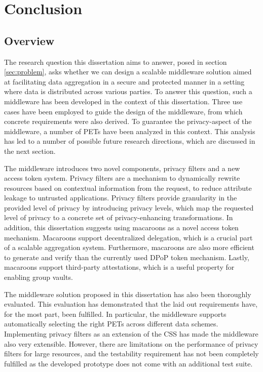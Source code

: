 \chapter{Conclusion}
\label{cha:conclusion}
\section{Overview}
The research question this dissertation aims to answer, posed in section \ref{sec:problem}, asks whether we can design a scalable middleware solution aimed at facilitating data aggregation in a secure and protected manner in a setting where data is distributed across various parties. To answer this question, such a middleware has been developed in the context of this dissertation. Three use cases have been employed to guide the design of the middleware, from which concrete requirements were also derived.  To guarantee the privacy-aspect of the middleware, a number of \acrlong{PETs} have been analyzed in this context. This analysis has led to a number of possible future research directions, which are discussed in the next section.

The middleware introduces two novel components, privacy filters and a new access token system. Privacy filters are a mechanism to dynamically rewrite resources based on contextual information from the request, to reduce attribute leakage to untrusted applications. Privacy filters provide granularity in the provided level of privacy by introducing privacy levels, which map the requested level of privacy to a concrete set of privacy-enhancing transformations. In addition, this dissertation suggests using macaroons as a novel access token mechanism. Macaroons support decentralized delegation, which is a crucial part of a scalable aggregation system. Furthermore, macaroons are also more efficient to generate and verify than the currently used \gls{DPoP} token mechanism. Lastly, macaroons support third-party attestations, which is a useful property for enabling group vaults.

The middleware solution proposed in this dissertation has also been thoroughly evaluated. This evaluation has demonstrated that the laid out requirements have, for the most part, been fulfilled. In particular, the middleware supports automatically selecting the right \gls{PETs} across different data schemes. Implementing privacy filters as an extension of the \gls{CSS} has made the middleware also very extensible. However, there are limitations on the performance of privacy filters for large resources, and the testability requirement has not been completely fulfilled as the developed prototype does not come with an additional test suite. 

